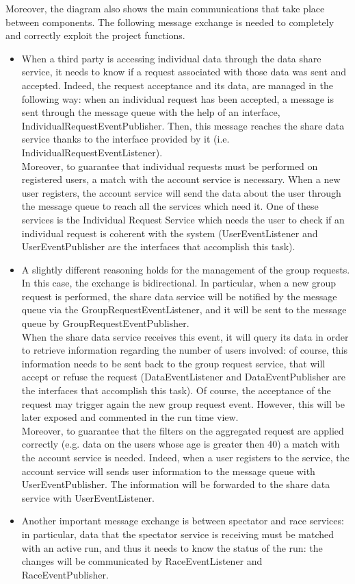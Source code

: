 \par 
Moreover, the diagram also shows the main communications that take place between components. 
The following message exchange is needed to completely and correctly exploit the project functions. 
\begin{itemize}
\item 
When a third party is accessing individual data through the data share service, it
needs to know if a request associated with those data was sent and accepted. 
Indeed, the request acceptance and its data, are managed in the following way: when an individual request has been accepted, a message is sent through the message queue with the help of an interface, IndividualRequestEventPublisher. Then, this message reaches the share data service thanks to the interface provided by it (i.e. IndividualRequestEventListener). \\
Moreover, to guarantee that individual requests must be performed on registered users, a match with the account service 
is necessary. When a new user registers, the account service will send the data about the user through the message queue to reach 
all the services which need it. One of these services is the Individual Request Service which needs the user to check if an individual 
request is coherent with the system (UserEventListener and UserEventPublisher are the interfaces that accomplish this task). 
\item 
A slightly different reasoning holds for the management of the group requests. In this case, the exchange is bidirectional. 
In particular, when a new group request is performed, the share data service will be notified by the message queue via the
GroupRequestEventListener, and it will be sent to the message queue by GroupRequestEventPublisher. \\
When the share data service receives this event, it will query its data in order to retrieve information regarding the number of users
involved: of course, this information needs to be sent back to the group request service, that will accept or refuse the request
(DataEventListener and DataEventPublisher are the interfaces that accomplish this task). 
Of course, the acceptance of the request may trigger again the new group request event. 
However, this will be later exposed and commented in the run time view. \\
Moreover, to guarantee that the filters on the aggregated request are applied correctly (e.g. data on the users whose age is greater then 40)
a match with the account service is needed. 
Indeed, when a user registers to the service, the account service will sends user information to the message queue with UserEventPublisher. 
The information will be forwarded to the share data service with UserEventListener.
\item
Another important message exchange is between spectator and race services: in particular, data that the spectator service is receiving must
be matched with an active run, and thus it needs to know the status of the run: the changes will be communicated by 
RaceEventListener and RaceEventPublisher.
\end{itemize}
